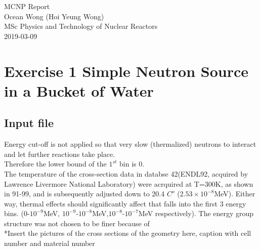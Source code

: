 \documentclass[a4paper, 12pt]{article}
\begin{document}
\begin{center}
MCNP Report										\\
Ocean Wong (Hoi Yeung Wong)						\\
MSc Physics and Technology of Nuclear Reactors	\\
2019-03-09 										\\
\end{center}

\section{Exercise 1 Simple Neutron Source in a Bucket of Water}
\subsection{Input file}
Energy cut-off is not applied so that very slow (thermalized) neutrons to interact and let further reactions take place.\\
Therefore the lower bound of the $1^{st}$ bin is 0.\\
The temperature of the cross-section data in databse 42(ENDL92, acquired by Lawrence Livermore National Laboratory) were acrquired at T=300K, as shown in 91-99, and is subsequently adjusted down to 20.4 $C^{o}$ ($2.53 \times 10^{-8}$MeV). Either way, thermal effects should significantly affect that falls into the first 3 energy bins. ($0$-$10^{-9}$MeV, $10^{-9}$-$10^{-8}$MeV,$10^{-8}$-$10^{-7}$MeV respectively). The energy group structure was not chosen to be finer because of
\\*Insert the pictures of the cross sections of the geometry here, caption with cell number and material number\\
\end{document}
